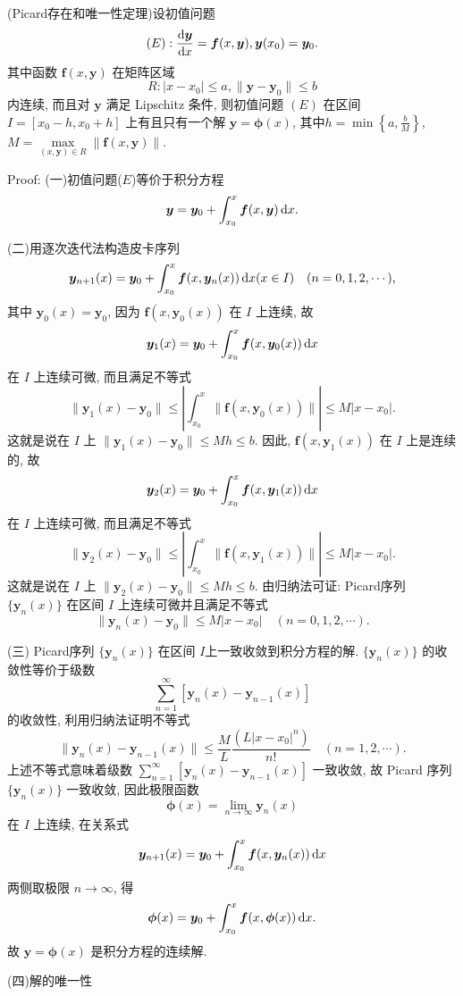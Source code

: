 \begin{solution}
  (Picard存在和唯一性定理)设初值问题
  \[(E):\frac{\mathop{}\!\mathrm{d}\bm{y}}{\mathop{}\!\mathrm{d} x}=\bm{f}(x,\bm{y}),\bm{y}(x_0)=\bm{y}_0.\]
  其中函数 $\bm{f}(x,\bm{y})$ 在矩阵区域
  \[R:|x-x_0|\leq a,\|\bm{y}-\bm{y}_0\|\leq b\]
  内连续, 而且对 $\bm{y}$ 满足 Lipschitz 条件, 则初值问题 $(E)$ 在区间 $I=[x_0-h,x_0+h]$
  上有且只有一个解 $\bm{y}=\bm{\phi}(x)$, 
  其中$\displaystyle h=\min\left\{a,\frac{b}{M}\right\}$, 
  $M=\max\limits_{(x,\bm{y})\in R}\|\bm{f}(x,\bm{y})\|$.

  Proof:
  (一)初值问题($E$)等价于积分方程
  \[\bm{y}=\bm{y}_0+\int_{x_0}^x\bm{f}(x,\bm{y})\mathop{}\!\mathrm{d} x.\]

  (二)用逐次迭代法构造皮卡序列
  \[\bm{y}_{n+1}(x)=\bm{y}_0+\int_{x_0}^x\bm{f}(x,\bm{y}_n(x))\mathop{}\!\mathrm{d} x(x\in I)\quad (n=0,1,2,\cdots),\]
  其中 $\bm{y}_0(x)=\bm{y}_0$, 因为 $\bm{f}(x,\bm{y}_0(x))$ 在 $I$ 上连续, 故
  \[\bm{y}_1(x)=\bm{y}_0+\int_{x_0}^x\bm{f}(x,\bm{y}_0(x))\mathop{}\!\mathrm{d} x\]
  在 $I$ 上连续可微, 而且满足不等式
  \[\|\bm{y}_1(x)-\bm{y}_0\|\leq\left|\int_{x_0}^x\|\bm{f}(x,\bm{y}_0(x))\|\right|\leq M|x-x_0|.\]
  这就是说在 $I$ 上 $\|\bm{y}_1(x)-\bm{y}_0\|\leq Mh\leq b$.
  因此, $\bm{f}(x,\bm{y}_1(x))$ 在 $I$ 上是连续的, 故
  \[\bm{y}_2(x)=\bm{y}_0+\int_{x_0}^x\bm{f}(x,\bm{y}_1(x))\mathop{}\!\mathrm{d} x\]
  在 $I$ 上连续可微, 而且满足不等式
  \[\|\bm{y}_2(x)-\bm{y}_0\|\leq\left|\int_{x_0}^x\|\bm{f}(x,\bm{y}_1(x))\|\right|\leq M|x-x_0|.\]
  这就是说在 $I$ 上 $\|\bm{y}_2(x)-\bm{y}_0\|\leq Mh\leq b$.
  由归纳法可证: Picard序列 $\{\bm{y}_n(x)\}$ 在区间 $I$ 上连续可微并且满足不等式
  \[\|\bm{y}_n(x)-\bm{y}_0\|\leq M|x-x_0|\quad(n=0,1,2,\cdots).\]

  (三) Picard序列 $\{\bm{y}_n(x)\}$ 在区间 $I$上一致收敛到积分方程的解.
  $\{\bm{y}_n(x)\}$ 的收敛性等价于级数
  \[\sum_{n=1}^{\infty}[\bm{y}_{n}(x)-\bm{y}_{n-1}(x)]\]
  的收敛性, 利用归纳法证明不等式
  \[\|\bm{y}_n(x)-\bm{y}_{n-1}(x)\|\leq\frac{M}{L}\frac{(L|x-x_0|^n)}{n!}\quad (n=1,2,\cdots).\]
  上述不等式意味着级数 $\sum\limits_{n=1}^{\infty}[\bm{y}_{n}(x)-\bm{y}_{n-1}(x)]$ 一致收敛, 
  故 Picard 序列 $\{\bm{y}_n(x)\}$ 一致收敛, 因此极限函数
  \[\bm{\phi}(x)=\lim_{n\to\infty}\bm{y}_n(x)\]
  在 $I$ 上连续, 在关系式
  \[\bm{y}_{n+1}(x)=\bm{y}_0+\int_{x_0}^x\bm{f}(x,\bm{y}_n(x))\mathop{}\!\mathrm{d} x\]
  两侧取极限 $n\to\infty$, 得
  \[\bm{\phi}(x)=\bm{y}_0+\int_{x_0}^x\bm{f}(x,\bm{\phi}(x))\mathop{}\!\mathrm{d} x.\]
  故 $\bm{y}=\bm{\phi}(x)$ 是积分方程的连续解.

  (四)解的唯一性


\end{solution}
